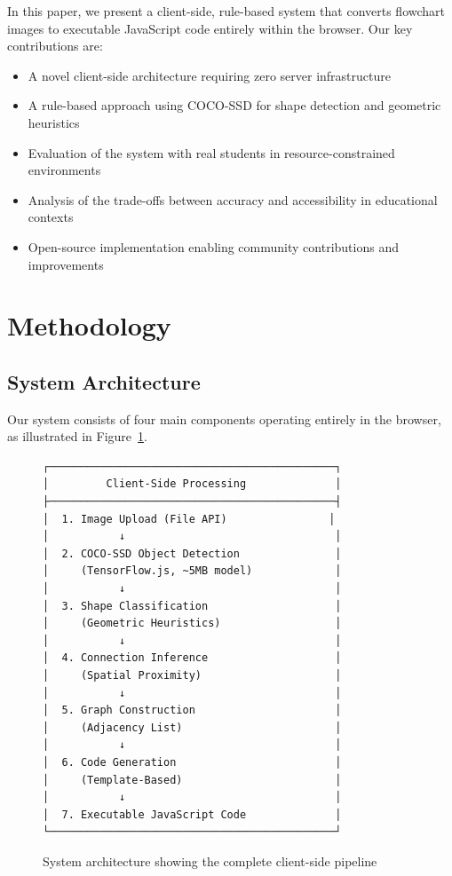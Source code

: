 \documentclass[11pt,a4paper]{article}
\begin{document}
In this paper, we present a client-side, rule-based system that converts flowchart images to executable JavaScript code entirely within the browser. Our key contributions are:

\begin{itemize}[leftmargin=*]
    \item A novel client-side architecture requiring zero server infrastructure
    \item A rule-based approach using COCO-SSD for shape detection and geometric heuristics
    \item Evaluation of the system with real students in resource-constrained environments
    \item Analysis of the trade-offs between accuracy and accessibility in educational contexts
    \item Open-source implementation enabling community contributions and improvements
\end{itemize}

\section{Methodology}

\subsection{System Architecture}

Our system consists of four main components operating entirely in the browser, as illustrated in Figure~\ref{fig:architecture}.

\begin{figure}[h]
\centering
\begin{verbatim}
┌─────────────────────────────────────────────┐
│         Client-Side Processing              │
├─────────────────────────────────────────────┤
│  1. Image Upload (File API)                │
│           ↓                                 │
│  2. COCO-SSD Object Detection               │
│     (TensorFlow.js, ~5MB model)             │
│           ↓                                 │
│  3. Shape Classification                    │
│     (Geometric Heuristics)                  │
│           ↓                                 │
│  4. Connection Inference                    │
│     (Spatial Proximity)                     │
│           ↓                                 │
│  5. Graph Construction                      │
│     (Adjacency List)                        │
│           ↓                                 │
│  6. Code Generation                         │
│     (Template-Based)                        │
│           ↓                                 │
│  7. Executable JavaScript Code              │
└─────────────────────────────────────────────┘
\end{verbatim}
\caption{System architecture showing the complete client-side pipeline}
\label{fig:architecture}
\end{figure}
\end{document}
